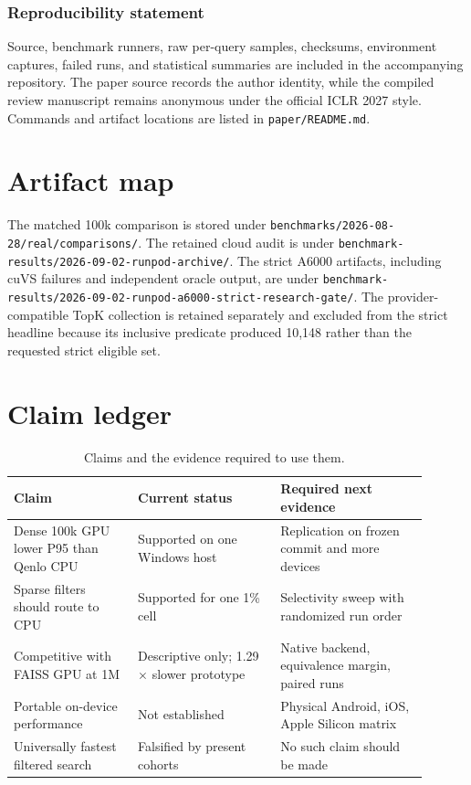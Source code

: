 \documentclass{article}
\newcommand{\code}[1]{\texttt{#1}}
\begin{document}
\subsubsection*{Reproducibility statement}
Source, benchmark runners, raw per-query samples, checksums, environment captures, failed runs, and
statistical summaries are included in the accompanying repository. The paper source records the
author identity, while the compiled review manuscript remains anonymous under the official ICLR
2027 style. Commands and artifact locations are listed in \code{paper/README.md}.




\appendix
\section{Artifact map}

The matched 100k comparison is stored under
\code{benchmarks/2026-08-28/real/comparisons/}. The retained cloud audit is under
\code{benchmark-results/2026-09-02-runpod-archive/}. The strict A6000 artifacts, including cuVS
failures and independent oracle output, are under
\code{benchmark-results/2026-09-02-runpod-a6000-strict-research-gate/}. The provider-compatible
TopK collection is retained separately and excluded from the strict headline because its inclusive
predicate produced 10,148 rather than the requested strict eligible set.

\section{Claim ledger}

\begin{table}[h]
\caption{Claims and the evidence required to use them.}
\centering
\small
\begin{tabular}{p{0.27\linewidth}p{0.31\linewidth}p{0.32\linewidth}}
\toprule
Claim & Current status & Required next evidence \\
\midrule
Dense 100k GPU lower P95 than Qenlo CPU & Supported on one Windows host & Replication on frozen commit and more devices \\
Sparse filters should route to CPU & Supported for one 1\% cell & Selectivity sweep with randomized run order \\
Competitive with FAISS GPU at 1M & Descriptive only; 1.29$\times$ slower prototype & Native backend, equivalence margin, paired runs \\
Portable on-device performance & Not established & Physical Android, iOS, Apple Silicon matrix \\
Universally fastest filtered search & Falsified by present cohorts & No such claim should be made \\
\bottomrule
\end{tabular}
\end{table}
\end{document}
